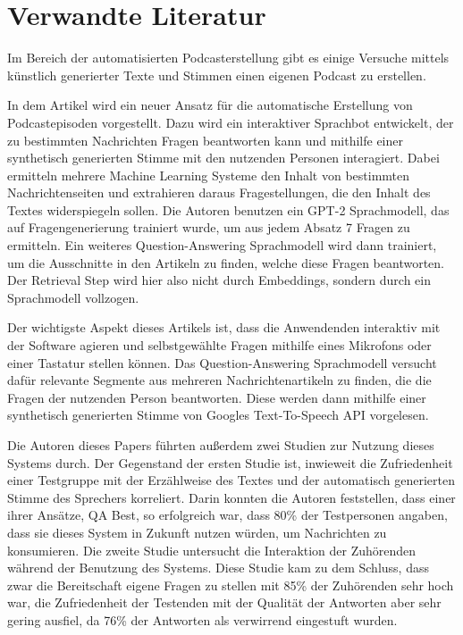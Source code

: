 \chapter{Verwandte Literatur}\label{ch:related_work}

Im Bereich der automatisierten Podcasterstellung gibt es einige Versuche mittels künstlich generierter Texte und Stimmen einen eigenen Podcast zu erstellen.

In dem Artikel  wird ein neuer Ansatz für die automatische Erstellung von Podcastepisoden vorgestellt. 
Dazu wird ein interaktiver Sprachbot entwickelt, der zu bestimmten Nachrichten Fragen beantworten kann und mithilfe einer synthetisch generierten Stimme mit den nutzenden Personen interagiert.
Dabei ermitteln mehrere Machine Learning Systeme den Inhalt von bestimmten Nachrichtenseiten und extrahieren daraus Fragestellungen, die den Inhalt des Textes widerspiegeln sollen. 
Die Autoren benutzen ein GPT-2 Sprachmodell, das auf Fragengenerierung trainiert wurde, um aus jedem Absatz 7 Fragen zu ermitteln. 
Ein weiteres Question-Answering Sprachmodell wird dann trainiert, um die Ausschnitte in den Artikeln zu finden, welche diese Fragen beantworten.  
Der Retrieval Step wird hier also nicht durch Embeddings, sondern durch ein Sprachmodell vollzogen.

Der wichtigste Aspekt dieses Artikels ist, dass die Anwendenden interaktiv mit der Software agieren und selbstgewählte Fragen mithilfe eines Mikrofons oder einer Tastatur stellen können.
Das Question-Answering Sprachmodell versucht dafür relevante Segmente aus mehreren Nachrichtenartikeln zu finden, die die Fragen der nutzenden Person beantworten.
Diese werden dann mithilfe einer synthetisch generierten Stimme von Googles Text-To-Speech API vorgelesen.

Die Autoren dieses Papers führten außerdem zwei Studien zur Nutzung dieses Systems durch.
Der Gegenstand der ersten Studie ist, inwieweit die Zufriedenheit einer Testgruppe mit der Erzählweise des Textes und der automatisch generierten Stimme des Sprechers korreliert. 
Darin konnten die Autoren feststellen, dass einer ihrer Ansätze, QA Best, so erfolgreich war, dass 80\% der Testpersonen angaben, dass sie dieses System in Zukunft nutzen würden, um Nachrichten zu konsumieren.
Die zweite Studie untersucht die Interaktion der Zuhörenden während der Benutzung des Systems. 
Diese Studie kam zu dem Schluss, dass zwar die Bereitschaft eigene Fragen zu stellen mit 85\% der Zuhörenden sehr hoch war, die Zufriedenheit der Testenden mit der Qualität der Antworten aber sehr gering ausfiel, da 76\% der Antworten als verwirrend eingestuft wurden.~\cite{laban2022}


